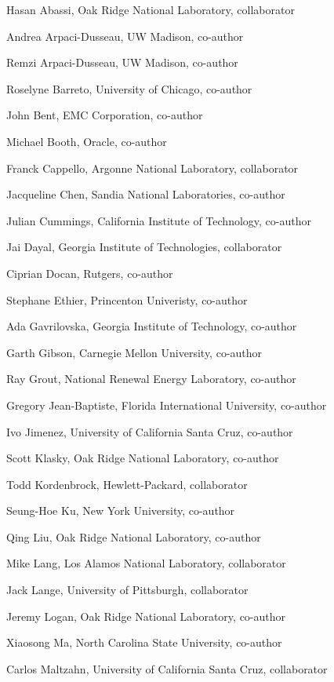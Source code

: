   \item Hasan Abassi, Oak Ridge National Laboratory, collaborator
  \item Andrea Arpaci-Dusseau, UW Madison, co-author
  \item Remzi Arpaci-Dusseau, UW Madison, co-author
  \item Roselyne Barreto, University of Chicago, co-author
  \item John Bent, EMC Corporation, co-author
  \item Michael Booth, Oracle, co-author
  \item Franck Cappello, Argonne National Laboratory, collaborator
  \item Jacqueline Chen, Sandia National Laboratories, co-author
  \item Julian Cummings, California Institute of Technology, co-author
  \item Jai Dayal, Georgia Institute of Technologies, collaborator
  \item Ciprian Docan, Rutgers, co-author
  \item Stephane Ethier, Princenton Univeristy, co-author
  \item Ada Gavrilovska, Georgia Institute of Technology, co-author
  \item Garth Gibson, Carnegie Mellon University, co-author
  \item Ray Grout, National Renewal Energy Laboratory, co-author
  \item Gregory Jean-Baptiste, Florida International University, co-author
  \item Ivo Jimenez, University of California Santa Cruz, co-author
  \item Scott Klasky, Oak Ridge National Laboratory, co-author
  \item Todd Kordenbrock, Hewlett-Packard, collaborator
  \item Seung-Hoe Ku, New York University, co-author
  \item Qing Liu, Oak Ridge National Laboratory, co-author
  \item Mike Lang, Los Alamos National Laboratory, collaborator
  \item Jack Lange, University of Pittsburgh, collaborator
  \item Jeremy Logan, Oak Ridge National Laboratory, co-author
  \item Xiaosong Ma, North Carolina State University, co-author
  \item Carlos Maltzahn, University of California Santa Cruz, collaborator
